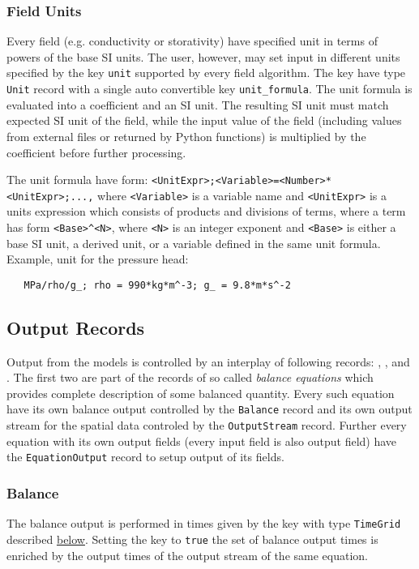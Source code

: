 \subsubsection{Field Units}
Every field (e.g. conductivity or storativity) have specified unit in terms of powers of the base SI units. 
The user, however, may set input in different units specified by the key \verb'unit' 
supported by every field algorithm. The key have type \verb'Unit' record with a single auto convertible key 
\verb'unit_formula'. The unit formula is evaluated  into a coefficient and an SI unit. The resulting SI unit 
must match expected SI unit of the field, while the input value 
of the field (including values from external files or returned by Python functions)  
is multiplied by the coefficient before further processing.

The unit formula have form: {\tt <UnitExpr>;<Variable>=<Number>*<UnitExpr>;...,}
where {\tt <Variable>} is a variable name and {\tt <UnitExpr>} is a units expression
which consists of products and divisions of terms, where a term has form \verb'<Base>^<N>', 
where {\tt <N>} is an integer exponent and {\tt <Base>} is either a base SI unit, 
a derived unit, or a variable defined in the same unit formula.
Example, unit for the pressure head: 
\begin{verbatim}
   MPa/rho/g_; rho = 990*kg*m^-3; g_ = 9.8*m*s^-2
\end{verbatim}


\subsection{Output Records}
Output from the models is controlled by an interplay of following records: ,
, and . The first two are part of the 
records of so called {\it balance equations} which provides complete description of some balanced quantity. 
Every such equation have its own balance output controlled by the \verb'Balance' record and its own output stream for the 
spatial data controled by the \verb'OutputStream' record. Further every equation with its own output fields 
(every input field is also output field) have the \verb'EquationOutput' record to setup output of its fields.

\subsubsection{Balance}
The balance output is performed in times given by the key 
with type \verb'TimeGrid' described \hyperlink{sec:TimeGrid}{below}. Setting the key  
to \verb'true' the set of balance output times is enriched by the output times of the output stream of the same equation.

